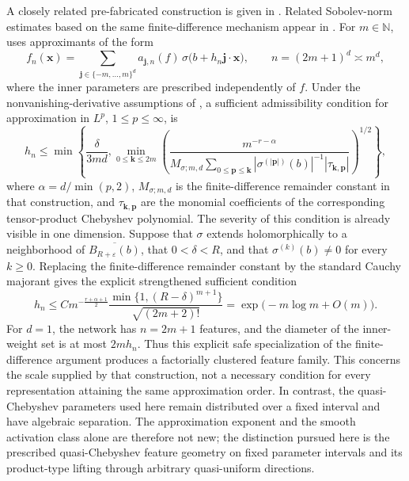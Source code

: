 \documentclass{article}
\numberwithin{equation}{section}
\def\NN{\mathbb{N}}
\def\bx{{\bm x}}
\def\bj{{\bm j}}
\begin{document}
A closely related pre-fabricated construction is given in \cite{mhaskar1996neural}. Related Sobolev-norm estimates based on the same finite-difference mechanism appear in \cite{park2026sobolev}. For $m\in\NN$, \cite{mhaskar1996neural} uses approximants of the form
\begin{equation}\label{eqn:mhaskar-approximant}
    f_n(\bx)=\sum_{\bj\in\{-m,\ldots,m\}^d}a_{\bj,n}(f)\,\sigma\bigl(b+h_n\bj\cdot\bx\bigr),
    \qquad
    n=(2m+1)^d\asymp m^d,
\end{equation}
where the inner parameters are prescribed independently of $f$. Under the nonvanishing-derivative assumptions of \cite[Theorem~2.1]{mhaskar1996neural}, a sufficient admissibility condition for approximation in $L^p$, $1\leq p\leq\infty$, is
\begin{equation}\label{eqn:mhaskar-scale}
    h_n\leq\min\left\{\frac{\delta}{3md},
    \min_{0\leq\mathbf{k}\leq2m}
    \left(
    \frac{m^{-r-\alpha}}
    {M_{\sigma;m,d}
    \sum_{0\leq\mathbf{p}\leq\mathbf{k}}
    |\sigma^{(|\mathbf{p}|)}(b)|^{-1}
    |\tau_{\mathbf{k},\mathbf{p}}|}
    \right)^{1/2}
    \right\},
\end{equation}
where $\alpha=d/\min(p,2)$, $M_{\sigma;m,d}$ is the finite-difference remainder constant in that construction, and $\tau_{\mathbf{k},\mathbf{p}}$ are the monomial coefficients of the corresponding tensor-product Chebyshev polynomial. The severity of this condition is already visible in one dimension. Suppose that $\sigma$ extends holomorphically to a neighborhood of $\overline{B_{R+\varepsilon}(b)}$, that $0<\delta<R$, and that $\sigma^{(k)}(b)\neq0$ for every $k\geq0$. Replacing the finite-difference remainder constant by the standard Cauchy majorant gives the explicit strengthened sufficient condition
\begin{equation}\label{eqn:mhaskar-factorial-scale}
    h_n
    \leq
    C m^{-\frac{r+\alpha+1}{2}}
    \frac{\min\{1,(R-\delta)^{m+1}\}}
    {\sqrt{(2m+2)!}}
    =
    \exp\bigl(-m\log m+O(m)\bigr).
\end{equation}
For $d=1$, the network has $n=2m+1$ features, and the diameter of the inner-weight set is at most $2mh_n$. Thus this explicit safe specialization of the finite-difference argument produces a factorially clustered feature family. This concerns the scale supplied by that construction, not a necessary condition for every representation attaining the same approximation order. In contrast, the quasi-Chebyshev parameters used here remain distributed over a fixed interval and have algebraic separation. The approximation exponent and the smooth activation class alone are therefore not new; the distinction pursued here is the prescribed quasi-Chebyshev feature geometry on fixed parameter intervals and its product-type lifting through arbitrary quasi-uniform directions.
\end{document}
